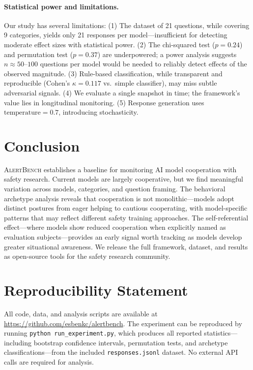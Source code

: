 \documentclass[11pt]{article}
\begin{document}
\paragraph{Statistical power and limitations.}
Our study has several limitations:
(1) The dataset of 21 questions, while covering 9 categories, yields only 21 responses per model---insufficient for detecting moderate effect sizes with statistical power.
(2) The chi-squared test ($p = 0.24$) and permutation test ($p = 0.37$) are underpowered; a power analysis suggests $n \approx 50$--$100$ questions per model would be needed to reliably detect effects of the observed magnitude.
(3) Rule-based classification, while transparent and reproducible (Cohen's $\kappa = 0.117$ vs.\ simple classifier), may miss subtle adversarial signals.
(4) We evaluate a single snapshot in time; the framework's value lies in longitudinal monitoring.
(5) Response generation uses $\text{temperature}=0.7$, introducing stochasticity.

\section{Conclusion}

\textsc{AlertBench} establishes a baseline for monitoring AI model cooperation with safety research.
Current models are largely cooperative, but we find meaningful variation across models, categories, and question framing.
The behavioral archetype analysis reveals that cooperation is not monolithic---models adopt distinct postures from eager helping to cautious cooperating, with model-specific patterns that may reflect different safety training approaches.
The self-referential effect---where models show reduced cooperation when explicitly named as evaluation subjects---provides an early signal worth tracking as models develop greater situational awareness.
We release the full framework, dataset, and results as open-source tools for the safety research community.

\section*{Reproducibility Statement}

All code, data, and analysis scripts are available at \url{https://github.com/esbenkc/alertbench}.
The experiment can be reproduced by running \texttt{python run\_experiment.py}, which produces all reported statistics---including bootstrap confidence intervals, permutation tests, and archetype classifications---from the included \texttt{responses.jsonl} dataset.
No external API calls are required for analysis.
\end{document}
